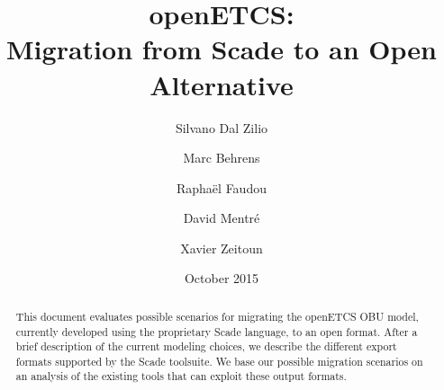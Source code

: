 \documentclass{template/openetcs_report}
\begin{document}
\frontmatter
{}




\title{openETCS:\\ Migration from Scade to an Open Alternative}

\subtitle{}

\date{October 2015}


\techassessorname{}
\techassessoraffil{}

\qualityassessorname{}
\qualityassessoraffil{}

\approvalname{}
\approvalaffil{}


\author{Silvano Dal Zilio}


\author{Marc Behrens}

\author{Raphaël Faudou}

\author{David Mentré}

\author{Xavier Zeitoun}

  




\begin{abstract}
  This document evaluates possible scenarios for migrating the
  openETCS OBU model, currently developed using the proprietary Scade
  language, to an open format. After a brief description of the
  current modeling choices, we describe the different export formats
  supported by the Scade toolsuite. We base our possible migration
  scenarios on an analysis of the existing tools that can exploit
  these output formats.
\end{abstract}
\end{document}
